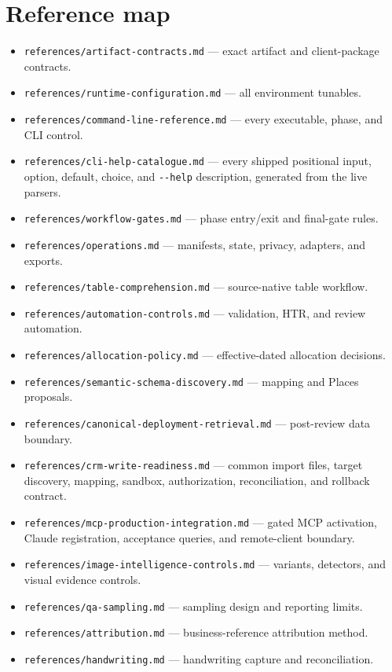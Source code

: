 \documentclass[
]{article}
\providecommand{\tightlist}{%
  \setlength{\itemsep}{0pt}\setlength{\parskip}{0pt}}
\begin{document}
\section{Reference map}\label{reference-map}

\begin{itemize}
\tightlist
\item
  \texttt{references/\allowbreak{}artifact-\allowbreak{}contracts.md}
  --- exact artifact and client-package contracts.
\item
  \texttt{references/\allowbreak{}runtime-\allowbreak{}configuration.md}
  --- all environment tunables.
\item
  \texttt{references/\allowbreak{}command-\allowbreak{}line-\allowbreak{}reference.md}
  --- every executable, phase, and CLI control.
\item
  \texttt{references/\allowbreak{}cli-\allowbreak{}help-\allowbreak{}catalogue.md}
  --- every shipped positional input, option, default, choice, and
  \texttt{-\/-help} description, generated from the live parsers.
\item
  \texttt{references/\allowbreak{}workflow-\allowbreak{}gates.md} ---
  phase entry/exit and final-gate rules.
\item
  \texttt{references/\allowbreak{}operations.md} --- manifests, state,
  privacy, adapters, and exports.
\item
  \texttt{references/\allowbreak{}table-\allowbreak{}comprehension.md}
  --- source-native table workflow.
\item
  \texttt{references/\allowbreak{}automation-\allowbreak{}controls.md}
  --- validation, HTR, and review automation.
\item
  \texttt{references/\allowbreak{}allocation-\allowbreak{}policy.md} ---
  effective-dated allocation decisions.
\item
  \texttt{references/\allowbreak{}semantic-\allowbreak{}schema-\allowbreak{}discovery.md}
  --- mapping and Places proposals.
\item
  \texttt{references/\allowbreak{}canonical-\allowbreak{}deployment-\allowbreak{}retrieval.md}
  --- post-review data boundary.
\item
  \texttt{references/\allowbreak{}crm-\allowbreak{}write-\allowbreak{}readiness.md}
  --- common import files, target discovery, mapping, sandbox,
  authorization, reconciliation, and rollback contract.
\item
  \texttt{references/\allowbreak{}mcp-\allowbreak{}production-\allowbreak{}integration.md}
  --- gated MCP activation, Claude registration, acceptance queries, and
  remote-client boundary.
\item
  \texttt{references/\allowbreak{}image-\allowbreak{}intelligence-\allowbreak{}controls.md}
  --- variants, detectors, and visual evidence controls.
\item
  \texttt{references/\allowbreak{}qa-\allowbreak{}sampling.md} ---
  sampling design and reporting limits.
\item
  \texttt{references/\allowbreak{}attribution.md} --- business-reference
  attribution method.
\item
  \texttt{references/\allowbreak{}handwriting.md} --- handwriting
  capture and reconciliation.
\end{itemize}
\end{document}
